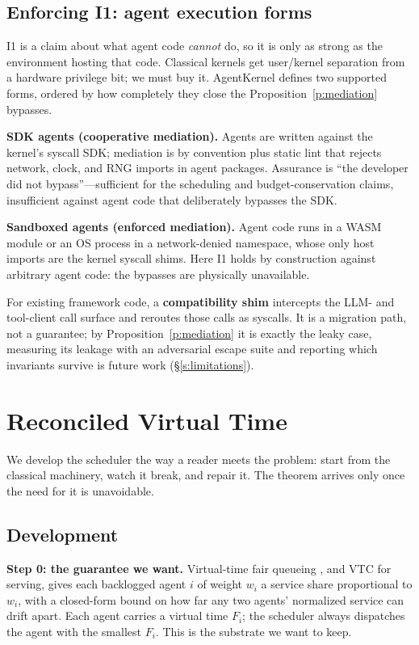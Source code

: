 \documentclass[letterpaper,11pt,leqno]{article}
\begin{document}
\subsection{Enforcing I1: agent execution forms}\label{s:forms}

I1 is a claim about what agent code \emph{cannot} do, so it is only as strong as the environment hosting that code. Classical kernels get user/kernel separation from a hardware privilege bit; we must buy it. AgentKernel defines two supported forms, ordered by how completely they close the Proposition~\ref{p:mediation} bypasses.

\textbf{SDK agents (cooperative mediation).} Agents are written against the kernel's syscall SDK; mediation is by convention plus static lint that rejects network, clock, and RNG imports in agent packages. Assurance is ``the developer did not bypass''---sufficient for the scheduling and budget-conservation claims, insufficient against agent code that deliberately bypasses the SDK.

\textbf{Sandboxed agents (enforced mediation).} Agent code runs in a WASM module \citep{Haas17} or an OS process in a network-denied namespace, whose only host imports are the kernel syscall shims. Here I1 holds by construction against arbitrary agent code: the bypasses are physically unavailable.

For existing framework code, a \textbf{compatibility shim} intercepts the LLM- and tool-client call surface and reroutes those calls as syscalls. It is a migration path, not a guarantee; by Proposition~\ref{p:mediation} it is exactly the leaky case, measuring its leakage with an adversarial escape suite and reporting which invariants survive is future work (\S\ref{s:limitations}).

\section{Reconciled Virtual Time}\label{s:rvt}

We develop the scheduler the way a reader meets the problem: start from the classical machinery, watch it break, and repair it. The theorem arrives only once the need for it is unavoidable.

\subsection{Development}\label{s:rvt-dev}

\textbf{Step 0: the guarantee we want.} Virtual-time fair queueing \citep{Demers89, Goyal96}, and VTC \citep{Sheng24} for serving, gives each backlogged agent $i$ of weight $w_i$ a service share proportional to $w_i$, with a closed-form bound on how far any two agents' normalized service can drift apart. Each agent carries a virtual time $F_i$; the scheduler always dispatches the agent with the smallest $F_i$. This is the substrate we want to keep.
\end{document}
